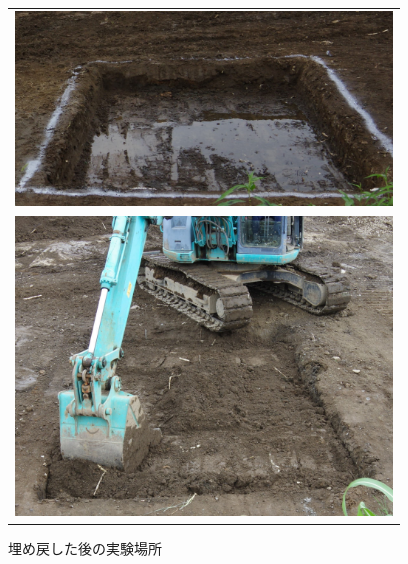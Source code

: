 \begin{figure}[p]
      \begin{center}
            \begin{tabular}{c}

                  \begin{minipage}[b]{\linewidth}
                  \centering
                  \includegraphics[width=10cm]{./ch5_ConeIndexEstimation/Fig/before_backfilled_site_compressed.pdf}
                  \caption{埋め戻す前の実験場所}\label{fig:before_backfilled_site}
                  \vspace{1cm}
                  \end{minipage}

                  \\

                  \begin{minipage}[b]{\linewidth}
                  \centering
                  \includegraphics[width=10cm]{./ch5_ConeIndexEstimation/Fig/after_backfilled_site_compressed.pdf}
                  \caption{埋め戻した後の実験場所}\label{fig:after_backfilled_site}
                  \end{minipage}

            \end{tabular}
      \end{center}
\end{figure}


